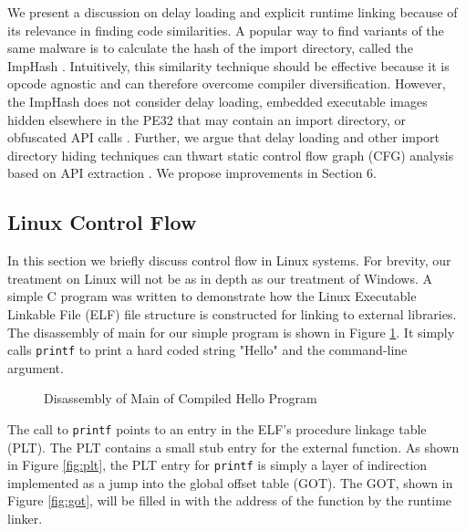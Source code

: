 \documentclass[preprint,12pt]{elsarticle}
\begin{document}
We present a discussion on delay loading and explicit runtime linking because of its relevance in finding code similarities. A popular way to find variants of the same malware is to calculate the hash of the import directory, called the ImpHash \cite{imphash} \cite{choi2015malware}. Intuitively, this similarity technique should be effective because it is opcode agnostic and can therefore overcome compiler diversification. However, the ImpHash does not consider delay loading, embedded executable images hidden elsewhere in the PE32 that may contain an import directory, or obfuscated API calls \cite{suenaga2009museum} \cite{srivastava2008system} \cite{o2011obfuscation}. Further, we argue that delay loading and other import directory hiding techniques can thwart static control flow graph (CFG) analysis based on API extraction \cite{alazab2010towards}. We propose improvements in Section 6.

\subsection{Linux Control Flow}

In this section we briefly discuss control flow in Linux systems. For brevity, our treatment on Linux will not be as in depth as our treatment of Windows. A simple C program was written to demonstrate how the Linux Executable Linkable File (ELF) file structure is constructed for linking to external libraries. The disassembly of main for our simple program is shown in Figure \ref{fig:hellomain}. It simply calls \texttt{printf} to print a hard coded string "Hello" and the command-line argument.

\begin{figure}[ht]
\centering{}
\caption{Disassembly of Main of Compiled Hello Program}
\label{fig:hellomain}
\end{figure}

The call to \texttt{printf} points to an entry in the ELF's procedure linkage table (PLT). The PLT contains a small stub entry for the external function. As shown in Figure \ref{fig:plt}, the PLT entry for \texttt{printf} is simply a layer of indirection implemented as a jump into the global offset table (GOT). The GOT, shown in Figure \ref{fig:got}, will be filled in with the address of the function by the runtime linker. 
\end{document}
